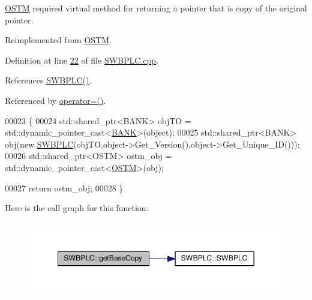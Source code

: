 \hyperlink{class_o_s_t_m}{O\+S\+TM} required virtual method for returning a pointer that is copy of the original pointer. 



Reimplemented from \hyperlink{class_o_s_t_m_a0bfa3763bd441407dd6365f42714f94c_a0bfa3763bd441407dd6365f42714f94c}{O\+S\+TM}.



Definition at line \hyperlink{_s_w_b_p_l_c_8cpp_source_l00022}{22} of file \hyperlink{_s_w_b_p_l_c_8cpp_source}{S\+W\+B\+P\+L\+C.\+cpp}.



References \hyperlink{_s_w_b_p_l_c_8h_source_l00024}{S\+W\+B\+P\+L\+C()}.



Referenced by \hyperlink{_s_w_b_p_l_c_8h_source_l00063}{operator=()}.


\begin{DoxyCode}
00023 \{
00024     std::shared\_ptr<BANK> objTO = std::dynamic\_pointer\_cast<\hyperlink{class_b_a_n_k}{BANK}>(object);
00025     std::shared\_ptr<BANK> obj(\textcolor{keyword}{new} \hyperlink{class_s_w_b_p_l_c_a320f4e2b023038668d941ce5d0c46aeb_a320f4e2b023038668d941ce5d0c46aeb}{SWBPLC}(objTO,object->Get\_Version(),\textcolor{keywordtype}{object}->Get\_Unique\_ID())); 
00026     std::shared\_ptr<OSTM> ostm\_obj = std::dynamic\_pointer\_cast<\hyperlink{class_o_s_t_m}{OSTM}>(obj);                             
           
00027     \textcolor{keywordflow}{return} ostm\_obj;
00028 \}
\end{DoxyCode}


Here is the call graph for this function\+:
\nopagebreak
\begin{figure}[H]
\begin{center}
\leavevmode
\includegraphics[width=349pt]{class_s_w_b_p_l_c_a77f0e0d6c08a95066d277bf6b2073a5c_a77f0e0d6c08a95066d277bf6b2073a5c_cgraph}
\end{center}
\end{figure}


